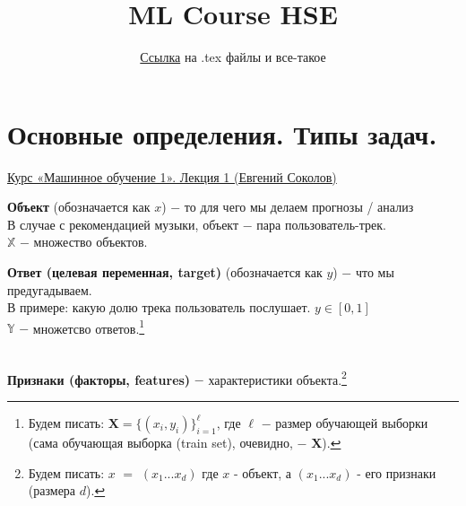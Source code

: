 


\newcommand{\bolditalic}[1]{\textbf{\textit{#1}}}

\title{ML Course HSE}



\author{
\href{https://github.com/danilpavlov/latex_lib/tree/main/univer/4sem/PIAA}{Ссылка} на .tex файлы и все-такое}
\maketitle
\tableofcontents
\newpage

\section{Основные определения. Типы задач.}
    \href{https://www.youtube.com/watch?v=QVs8QjuAN74&list=PLEqoHzpnmTfChItexxg2ZfxCsm-8QPsdS}{Курс «Машинное обучение 1». Лекция 1 (Евгений Соколов)}\\

    \begin{definition}
        \textbf{Объект} (обозначается как $x$) $-$ то для чего мы делаем прогнозы / анализ \\
        В случае с рекомендацией музыки, объект $-$ пара пользователь-трек.\\
        $\mathbb{X}$ $-$ множество объектов.
    \end{definition}

    \begin{definition}
        \textbf{Ответ (целевая переменная, target)} (обозначается как $y$) $-$ что мы предугадываем.\\
        В примере: какую долю трека пользователь послушает. $y \in [0, 1]$\\
        $\mathbb{Y}$ $-$ множетсво ответов.\footnote{
    Будем писать: $\mathbf{X} = \{(x_i, y_i) \}_{i=1}^\ell$, где $\ell$ $-$ размер обучающей выборки (сама обучающая выборка (train set), очевидно, $-$ $\mathbf{X}$). }\\
    \end{definition}

    \\


    \textbf{Признаки (факторы, features)} $-$ характеристики объекта.\footnote{Будем писать: $x$ $=$ $(x_1 ... x_d)$
        где $x$ - объект, а $(x_1 ... x_d)$ - его признаки (размера $d$).}\\

